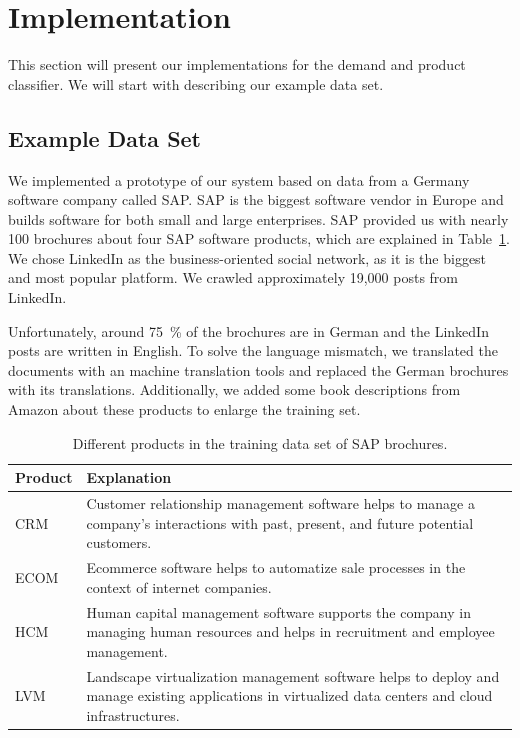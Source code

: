 
\section{Implementation}
\label{sec:implementation}

This section will present our implementations for the demand and product classifier.
We will start with describing our example data set.

\subsection{Example Data Set}
\label{sub:initial_data_set}
We implemented a prototype of our \nto system based on data from a Germany software company called SAP.
SAP is the biggest software vendor in Europe and builds software for both small and large enterprises.
SAP provided us with nearly 100 brochures about four SAP software products, which are explained in Table~\ref{table:products}.
We chose LinkedIn as the business-oriented social network, as it is the biggest and most popular platform.
We crawled approximately 19,000 posts from LinkedIn.

Unfortunately, around 75~\% of the brochures are in German and the LinkedIn posts are written in English.
To solve the language mismatch, we translated the documents with an machine translation tools and replaced the German brochures with its translations.
Additionally, we added some book descriptions from Amazon about these products to enlarge the training set.

\begin{table}[h]
	\centering
	{
		\renewcommand\arraystretch{1.25}
		\begin{tabular}{lll}
			\hline
			\textbf{Product} & \multicolumn{2}{l}{\textbf{Explanation}} \\
			\hline\hline
			CRM  & \multicolumn{2}{p{10cm}}{\raggedright
				Customer relationship management software helps to manage a company's interactions with past, present, and future potential customers.} \\
			\hline
			ECOM  & \multicolumn{2}{p{10cm}}{\raggedright
				Ecommerce software helps to automatize sale processes in the context of internet companies.} \\
			\hline
			HCM  & \multicolumn{2}{p{10cm}}{\raggedright
				Human capital management software supports the company in managing human resources and helps in recruitment and employee management.} \\
			\hline
			LVM  & \multicolumn{2}{p{10cm}}{\raggedright
				Landscape virtualization management software helps to deploy and manage existing applications in virtualized data centers and cloud infrastructures.} \\
			\hline
		\end{tabular}
	}
	\caption{Different products in the training data set of SAP brochures.}
	\label{table:products}
\end{table}

